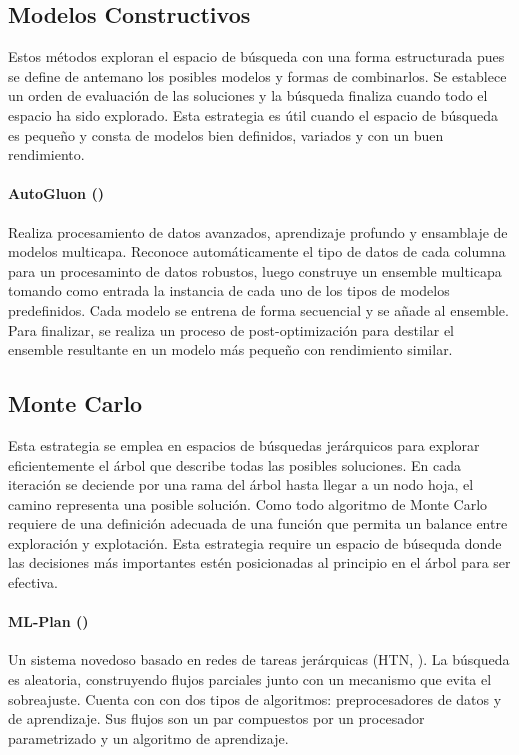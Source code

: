 
\subsection{Modelos Constructivos}
Estos m\'etodos exploran el espacio de b\'usqueda con una forma estructurada pues se define de antemano los posibles modelos y formas de combinarlos. Se establece un orden de evaluaci\'on de las soluciones y la b\'usqueda finaliza cuando todo el espacio ha sido explorado. Esta estrategia es \'util cuando el espacio de b\'usqueda es peque\~no y consta de modelos bien definidos, variados y con un buen rendimiento.

\paragraph{AutoGluon (\cite{erickson2020autogluon})} Realiza procesamiento de datos avanzados, aprendizaje profundo y ensamblaje de modelos multicapa. Reconoce autom\'aticamente el tipo de datos de cada columna para un procesaminto de datos robustos, luego construye un ensemble multicapa  tomando como entrada la instancia de cada uno de los tipos de modelos predefinidos. Cada modelo se entrena de forma secuencial y se a\~nade al ensemble. Para finalizar, se realiza un proceso de post-optimizaci\'on para destilar el ensemble resultante en un modelo m\'as peque\~no con rendimiento similar.

\subsection{Monte Carlo}
 Esta estrategia se emplea en espacios de b\'usquedas jer\'arquicos para explorar eficientemente el \'arbol que describe todas las  posibles soluciones. En cada iteraci\'on se deciende por una rama del \'arbol hasta llegar a un nodo hoja, el camino representa una posible soluci\'on. Como todo algoritmo de Monte Carlo requiere de una definici\'on adecuada de una funci\'on que permita un balance entre exploraci\'on y explotaci\'on. Esta estrategia require un espacio de b\'usequda donde las decisiones m\'as importantes est\'en posicionadas al principio en el \'arbol para ser efectiva.

 \paragraph{ML-Plan (\cite{mohr2018ml})} Un sistema novedoso basado en redes de tareas jer\'arquicas (HTN, \cite{erol1994umcp}). La b\'usqueda es aleatoria, construyendo flujos parciales junto con un mecanismo que evita el sobreajuste. Cuenta con con dos tipos de algoritmos:  preprocesadores de datos y de aprendizaje. Sus flujos son un par compuestos por un procesador parametrizado y un algoritmo de aprendizaje.
    


